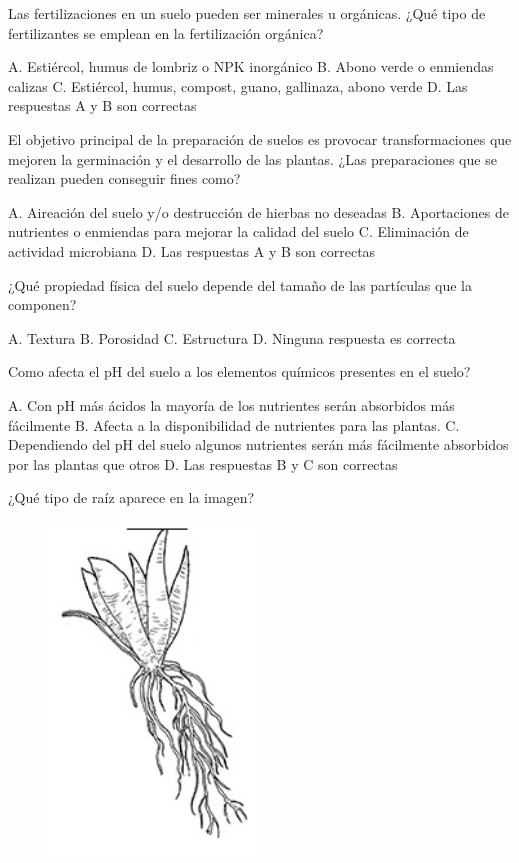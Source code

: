 \documentclass[11pt]{exam}
\begin{document}
{\begin{questions}
\question Las fertilizaciones en un suelo pueden ser minerales u orgánicas. ¿Qué tipo
  de fertilizantes se emplean en la fertilización orgánica?
  \begin{checkboxes}
    \choice A. Estiércol, humus de lombriz o NPK inorgánico
    \choice B. Abono verde  o enmiendas calizas
    \CorrectChoice C. Estiércol, humus, compost, guano, gallinaza, abono verde
    \choice D. Las respuestas A y B son correctas
  \end{checkboxes}
  \newpage
\question El objetivo principal de la preparación de suelos es provocar transformaciones
  que mejoren la germinación y el desarrollo de las plantas. ¿Las preparaciones que se
  realizan pueden conseguir fines como?
  \begin{checkboxes}
    \choice A. Aireación del suelo y/o destrucción de hierbas no deseadas
    \choice B. Aportaciones de nutrientes o enmiendas para mejorar la calidad del suelo
    \choice C. Eliminación de actividad microbiana
    \CorrectChoice D. Las respuestas A y B son correctas
  \end{checkboxes}
\question ¿Qué propiedad física del suelo depende del tamaño de las partículas que la
  componen?
  \begin{checkboxes}
    \CorrectChoice A. Textura
    \choice B. Porosidad
    \choice C. Estructura
    \choice D. Ninguna respuesta es correcta
  \end{checkboxes}
\question Como afecta el pH del suelo a los elementos químicos presentes en el suelo?
  \begin{checkboxes}
    \choice A. Con pH más ácidos la mayoría de los nutrientes serán absorbidos más
    fácilmente
    \choice B. Afecta a la disponibilidad de nutrientes para las plantas.
    \choice C. Dependiendo del pH del suelo algunos nutrientes serán más fácilmente
    absorbidos por las plantas que otros
    \CorrectChoice D. Las respuestas B y C son correctas
  \end{checkboxes}
  \newpage
\question ¿Qué tipo de raíz aparece en la imagen?
  \begin{figure}[h!]
    \centering
    \includegraphics[width=0.5\textwidth]{fasciculada.PNG}

\end{figure}
\end{questions}}
\end{document}
